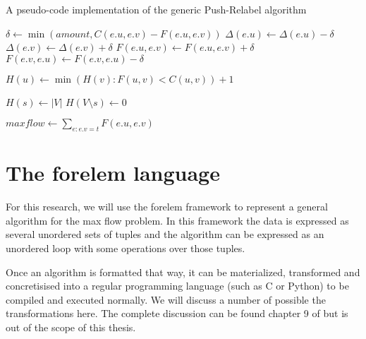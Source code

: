 \begin{algorithm}
\caption{A pseudo-code implementation of the generic Push-Relabel algorithm}
\label{algo:push-relabel}

\begin{algorithmic}
	\State $\delta \gets \min(amount, C(e.u, e.v) - F(e.u, e.v))$
	\State $\Delta(e.u) \gets \Delta(e.u) - \delta$
	\State $\Delta(e.v) \gets \Delta(e.v) + \delta$
	\State $F(e.u, e.v) \gets F(e.u, e.v) + \delta$
	\State $F(e.v, e.u) \gets F(e.v, e.u) - \delta$
\EndFunction

\State

	\State $H(u) \gets \min(H(v) : F(u, v) < C(u, v)) + 1$
\EndFunction

\State

	\State {}
\EndFor

\State

\State $H(s) \gets |V|$
\State $H(V \setminus s) \gets 0$

\State

		\State {}
	\Else
		\State {}
	\EndIf
\EndWhile

\State

\State $maxflow \gets \sum\limits_{e : e.v = t} F(e.u, e.v)$
\end{algorithmic}
\end{algorithm}

\section{The forelem language}

For this research, we will use the forelem framework \cite{AVersatileTupleBasedOptimizationFramework} to represent a general algorithm for the max flow problem. In this framework the data is expressed as several unordered sets of tuples and the algorithm can be expressed as an unordered loop with some operations over those tuples.


Once an algorithm is formatted that way, it can be materialized, transformed and concretisised into a regular programming language (such as C or Python) to be compiled and executed normally. We will discuss a number of possible the transformations here. The complete discussion can be found chapter 9 of \cite{AVersatileTupleBasedOptimizationFramework} but is out of the scope of this thesis.

